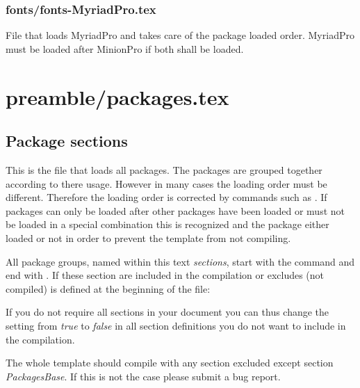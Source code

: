 
\subsubsection{fonts/fonts-MyriadPro.tex}
File that loads MyriadPro and takes care of the package loaded order. MyriadPro must be loaded after MinionPro if both shall be loaded.


\section{preamble/packages.tex}

\subsection{Package sections}

This is the file that loads all packages. The packages are grouped together according to there usage. However in many cases the loading order must be different. Therefore the loading order is corrected by commands such as . If packages can only be loaded after other packages have been loaded or must not be loaded in a special combination this is recognized and the package either loaded or not in order to prevent the template from not compiling. 

All package groups, named within this text \emph{sections}, start with the command  and end with . If these section are included in the compilation or excludes (not compiled) is defined at the beginning of the file:


If you do not require all sections in your document you can thus change the setting from \emph{true} to \emph{false} in all section definitions you do not want to include in the compilation.

The whole template should compile with any section excluded except section \emph{PackagesBase}. If this is not the case please submit a bug report.

